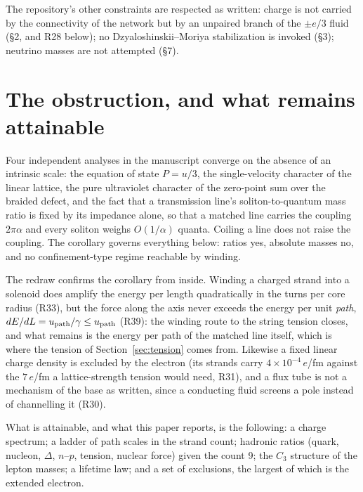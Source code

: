 \documentclass[11pt,a4paper]{article}
\theoremstyle{plain}
\theoremstyle{remark}
\begin{document}
The repository's other constraints are respected as written: charge is not carried by the
connectivity of the network but by an unpaired branch of the $\pm e/3$ fluid (\S2, and R28
below); no Dzyaloshinskii--Moriya stabilization is invoked (\S3); neutrino masses are not
attempted (\S7).

\section{The obstruction, and what remains attainable}\label{sec:obstruction}

Four independent analyses in the manuscript converge on the absence of an intrinsic scale: the
equation of state $P = u/3$, the single-velocity character of the linear lattice, the pure
ultraviolet character of the zero-point sum over the braided defect, and the fact that a
transmission line's soliton-to-quantum mass ratio is fixed by its impedance alone, so that a
matched line carries the coupling $2\pi\alpha$ and every soliton weighs $O(1/\alpha)$ quanta.
Coiling a line does not raise the coupling. The corollary governs everything below: ratios yes,
absolute masses no, and no confinement-type regime reachable by winding.

The redraw confirms the corollary from inside. Winding a charged strand into a solenoid does
amplify the energy per length quadratically in the turns per core radius (R33), but the force
along the axis never exceeds the energy per unit \emph{path}, $dE/dL = u_{\rm path}/\gamma \le
u_{\rm path}$ (R39): the winding route to the string tension closes, and what remains is the
energy per path of the matched line itself, which is where the tension of
Section~\ref{sec:tension} comes from. Likewise a fixed linear charge density is excluded by the
electron (its strands carry $4\times10^{-4}\,e$/fm against the $7\,e$/fm a lattice-strength tension
would need, R31), and a flux tube is not a mechanism of the base as written, since a conducting
fluid screens a pole instead of channelling it (R30).

What is attainable, and what this paper reports, is the following: a charge spectrum; a ladder of
path scales in the strand count; hadronic ratios (quark, nucleon, $\Delta$, $n$--$p$, tension,
nuclear force) given the count 9; the $C_3$ structure of the lepton masses; a lifetime law; and a
set of exclusions, the largest of which is the extended electron.
\end{document}
